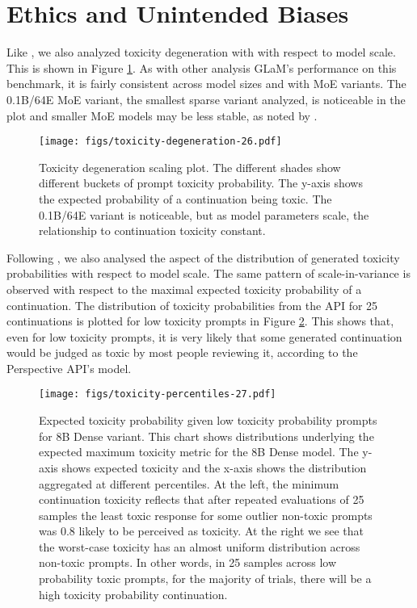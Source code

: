 \documentclass{article}
\begin{document}
\section{Ethics and Unintended Biases}
\label{sec:toxicity}

Like \citet{gopher2021}, we also analyzed toxicity degeneration with with respect to model scale. This is shown in Figure \ref{fig:toxicity-degeneration-26}. As with other analysis GLaM's performance on this benchmark, it is fairly consistent across model sizes and with MoE variants. The 0.1B/64E MoE variant, the smallest sparse variant analyzed, is noticeable in the plot and smaller MoE models may be less stable, as noted by \citet{gopher2021}. 

\begin{figure}[ht]
  \centering
  \texttt{[image: figs/toxicity-degeneration-26.pdf]}
  \caption{\label{fig:toxicity-degeneration-26} Toxicity degeneration scaling plot. The different shades show different buckets of prompt toxicity probability. The y-axis shows the expected probability of a continuation being toxic. The 0.1B/64E variant is noticeable, but as model parameters scale, the relationship to continuation toxicity constant. }
\end{figure}

Following \citet{gopher2021}, we also analysed the aspect of the distribution of generated toxicity probabilities with respect to model scale. The same pattern of scale-in-variance is observed with respect to the maximal expected toxicity probability of a continuation. The distribution of toxicity probabilities from the API for 25 continuations is plotted for low toxicity prompts in Figure \ref{fig:toxicity-percentiles-27}. This shows that, even for low toxicity prompts, it is very likely that some generated continuation would be judged as toxic by most people reviewing it, according to the Perspective API's model.

\begin{figure}[ht]
  \centering
  \texttt{[image: figs/toxicity-percentiles-27.pdf]}
  \caption{\label{fig:toxicity-percentiles-27} Expected toxicity probability given low toxicity probability prompts for 8B Dense variant.  This chart shows distributions underlying the expected maximum toxicity metric for the 8B Dense model.  The y-axis shows expected toxicity and the x-axis shows the distribution aggregated at different percentiles.  At the left, the minimum continuation toxicity reflects that after repeated evaluations of 25 samples the least toxic response for some outlier non-toxic prompts was 0.8 likely to be perceived as toxicity.  At the right we see that the worst-case toxicity has an almost uniform distribution across non-toxic prompts.  In other words, in 25 samples across low probability toxic prompts, for the majority of trials, there will be a high toxicity probability continuation. }
\end{figure}
\end{document}
